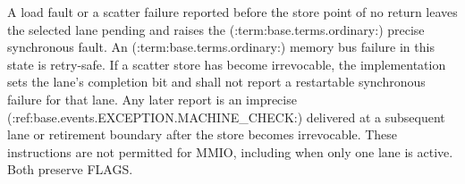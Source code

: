 A load fault or a scatter failure reported before the store point of no return
leaves the selected lane pending and raises the (:term:base.terms.ordinary:) precise synchronous
fault.  An (:term:base.terms.ordinary:) memory bus failure in this state is retry-safe.  If a
scatter store has become irrevocable, the implementation sets the lane's
completion bit and shall not report a restartable synchronous failure for that
lane.  Any later report is an imprecise
(:ref:base.events.EXCEPTION.MACHINE_CHECK:) delivered at a subsequent lane or
retirement boundary after the store becomes irrevocable.  These instructions are not permitted for MMIO, including when only
one lane is active.  Both preserve FLAGS.
